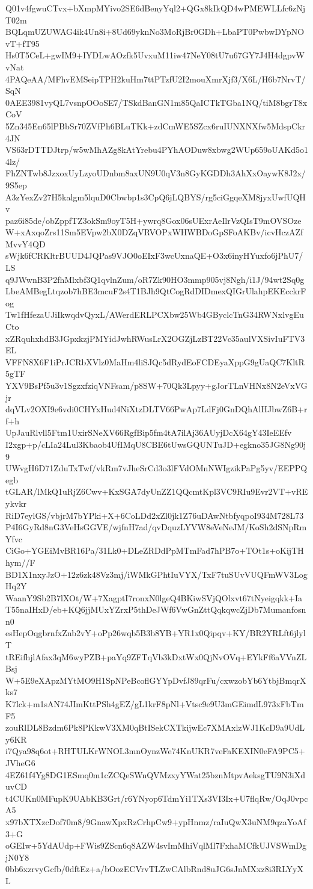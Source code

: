 Q01v4fgwuCTvx+bXmpMYivo2SE6dBenyYql2+QGx8kIkQD4wPMEWLLfc6zNjT02m
BQLqmUZUWAG4ik4Un8i+8Ud69yknNo3MoRjBr0GDh+LbaPT0PwbwDYpNOvT+fT95
Hs0T5CeL+gwIM9+IYDLwAOzfk5UvxuM11iw47NeY08tU7u67GY7J4H4dgpvWvNat
4PAQeAA/MFhvEMSeipTPH2kuHm7ttPTzfU2I2mouXmrXjf3/X6L/H6b7NrvT/SqN
0AEE3981vyQL7vsnpOOoSE7/TSkdBanGN1m85QaICTkTGba1NQ/tiM8bgrT8xCoV
5Zn345En65lPBbSr70ZVfPh6BLuTKk+zdCmWE5SZcx6ruIUNXNXfw5MdspCkr4JN
VS63rDTTDJtrp/w5wMhAZg8kAtYrebu4PYhAODuw8xbwg2WUp659oUAKd5o14lz/
FhZNTwb8JzxoxUyLzyoUDnbm8axUN9U0qV3n8GyKGDDh3AhXxOaywK8J2x/9S5ep
A3zYexZv27H5kalgm5lquD0Cbwbp1s3CpQ6jLQBYS/rg5ciGgqeXM8jyxUwfUQHv
paz6i85de/obZppfTZ3okSm9oyT5H+ywrq8Gox06sUExrAeIlrVzQIsT9mOVSOze
W+xAxqoZrs11Sm5EVpw2bX0DZqVRVOPxWHWBDoGpSFoAKBv/icvHczAZfMvvY4QD
sWjk6fCRKltrBUUD4JQPas9VJO0oEIxF3wcUxnaQE+O3x6inyHYuxfo6jPhU7/LS
q9JWwnB3P2fhMlxbf3Q1qvlnZum/oR7Zk90HO3mmp905vj8Ngh/i1J/94wt2Sq0g
LbeAMBegLtqzob7hBE3mcuF2s4T1BJh9QtCogRdDIDmexQIGrUlahpEKEcckrFog
Tw1fHfezaUJiIkwqdvQyxL/AWerdERLPCXbw25Wb4GByclcTnG34RWNxlvgEuCto
xZRquhxhdB3JGpxkzjPMYidJwhRWusLrX2OGZjLzBT22Vc35aulVXSivIuFTV3EL
VFFN8X6F1iPrJCRbXVlz0MaHm4liSJQc5dRydEoFCDEyaXppG9gUaQC7KltR5gTF
YXV9BsPf5u3v1SgzxfziqVNFsam/p8SW+70Qk3Lpyy+gJorTLnVHNx8N2eVxVGjr
dqVLv2OXI9e6vdi0CHYxHud4NiXtzDLTV66PwAp7LdFj0GnDQhAlHJbwZ6B+rf+h
UpJauRlvll5Ftm1UxirSNeXV66RgfBip5fm4tA7ilAj36AUyjDcX64gY43IeEEfv
I2xgp+p/cLIa24Lul3Kbaob4UfIMqU8CBE6tUwsGQUNTuJD+egkno35JG8Ng90j9
UWvgH6D71ZduTxTwf/vkRm7vJheSrCd3o3lFVdOMnNWIgzikPaPg5yv/EEPPQegb
tGLAR/lMkQ1uRjZ6Cwv+KxSGA7dyUnZZ1QQcmtKpl3VC9RIu9Evr2VT+vREykvkr
RiD7eylGS/vbjrM7bYPki+X+6CoLDd2xZl0jk1Z76uDAwNtbfyqpoI934M728L73
P4I6GyRd8nG3VeHsGGVE/wjfnH7ad/qvDquzLYVW8eVeNeJM/KoSh2dSNpRmYfvc
CiGo+YGEiMvBR16Pa/31Lk0+DLeZRDdPpMTmFad7hPB7o+TOt1s+oKijTHhym//F
BD1X1nxyJzO+12z6zk48Vz3mj/iWMkGPhtIuVYX/TxF7tuSUvVUQFmWV3LogHq2Y
WaanY9Sb2B7lXOt/W+7XagptI7ronxN0lgeQ4BKiwSVjQOlxvt67tNyeigqkk+Ia
T55naIHxD/eb+KQ6jjMUxYZrxP5thDeJWf6VwGnZttQqkqwcZjDb7Mumanfosnn0
esHepOqgbrnfxZnb2vY+oPp26wqb5B3b8YB+YR1x0Qipqv+KY/BR2YRLft6jlylT
tREifhjlAfax3qM6wyPZB+paYq9ZFTqVb3kDxtWx0QjNvOVq+EYkFf6aVVnZLBsj
W+5E9eXApzMYtMO9H1SpNPeBcoflGYYpDvfJ89qrFu/cxwzobYb6YtbjBmqrXks7
K7lck+m1sAN74JImKttPSh4gEZ/gL1krF8pNl+Vtsc9e9U3mGEimdL973xFbTmF5
zouRlDL8Bzdm6Pk8PKkwV3XM0qBtISekCXTkijwEc7XMAxlzWJ1KcD9a9UdLy6KR
i7Qya98q6ot+RHTULKrWNOL3mnOynzWe74KnUKR7veFaKEXIN0eFA9PC5+JVheG6
4EZ61f4Yg8DG1ESmq0m1cZCQeSWnQVMzxyYWat25bznMtpvAeksgTU9N3iXduvCD
t4CUKn0MFupK9UAbKB3Grt/r6YNyop6TdmYi1TXs3VI3Ix+U7flqRw/OqJ0vpcA5
x97bXTXzcDof70m8/9GnawXpxRzCrhpCw9+ypHnmz/raIuQwX3uNM9qzaYoAf3+G
oGEIw+5YdAUdp+FWis9ZScn6q8AZW4svImMhiVqlMl7FxhaMCfkUJVSWmDgjN0Y8
0bb6xzrvyGcfb/0dftEz+a/bOozECVrvTLZwCAlbRnd8uJG6sJnMXxz8i3RLYyXL
